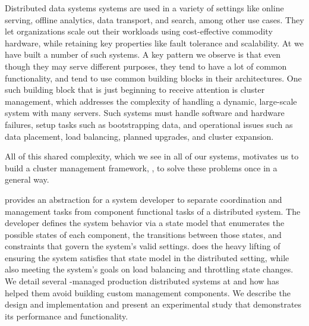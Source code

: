 Distributed data systems systems are used in a variety of
settings like online serving, offline analytics, data 
transport, and search, among other use cases.  They let organizations scale out their 
workloads using cost-effective commodity hardware, while retaining key properties 
like fault tolerance and scalability.  At \linkedin we have built a number of
such systems.  A key pattern we observe is that even though they may serve different purposes, 
they tend to have a lot of common functionality, and tend to use common building blocks 
in their architectures.  One such building block that is just beginning to
receive attention is cluster management, which addresses 
the complexity of handling a dynamic, large-scale system with many servers.  
Such systems must handle software and hardware failures, 
setup tasks such as bootstrapping data, and
operational issues such as data placement, load balancing, planned upgrades, and cluster expansion.  
 
All of this shared complexity, which we see in all of our systems, motivates us
to build a cluster management framework, \helix, to solve these problems once in a
general way.

\helix provides an abstraction for a system developer to separate coordination and management tasks
from component functional tasks of a distributed system.  The developer defines the system behavior via a 
state model that enumerates the possible states of each component, the transitions between those states, 
and constraints that govern the system's valid settings. \helix does the heavy lifting of
ensuring the system satisfies that state model in the distributed setting,
while also meeting the system's goals on load balancing and throttling state
changes.
We detail several \helix-managed production distributed systems 
at \linkedin and how \helix has helped them avoid building custom management components.  
We describe the \helix design and implementation and present an experimental
study that demonstrates its performance and functionality.

